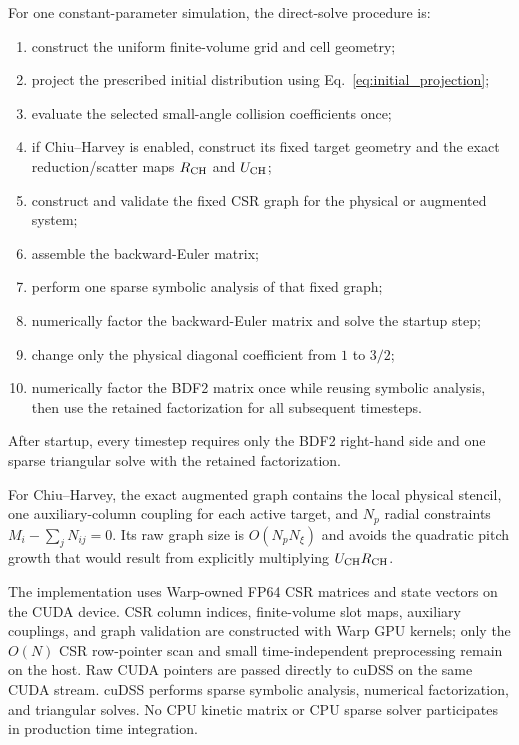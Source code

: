 \documentclass[11pt]{article}
\begin{document}
For one constant-parameter simulation, the direct-solve procedure is:
\begin{enumerate}
 \item construct the uniform finite-volume grid and cell geometry;
 \item project the prescribed initial distribution using Eq.~\eqref{eq:initial_projection};
 \item evaluate the selected small-angle collision coefficients once;
 \item if Chiu--Harvey is enabled, construct its fixed target geometry and the exact
       reduction/scatter maps $R_{\rm CH}$ and $U_{\rm CH}$;
 \item construct and validate the fixed CSR graph for the physical or augmented system;
 \item assemble the backward-Euler matrix;
 \item perform one sparse symbolic analysis of that fixed graph;
 \item numerically factor the backward-Euler matrix and solve the startup step;
 \item change only the physical diagonal coefficient from $1$ to $3/2$;
 \item numerically factor the BDF2 matrix once while reusing symbolic analysis, then use
       the retained factorization for all subsequent timesteps.
\end{enumerate}
After startup, every timestep requires only the BDF2 right-hand side and one sparse
triangular solve with the retained factorization.

For Chiu--Harvey, the exact augmented graph contains the local physical stencil, one
auxiliary-column coupling for each active target, and $N_p$ radial constraints
$M_i-\sum_jN_{ij}=0$.  Its raw graph size is $O(N_pN_\xi)$ and avoids the quadratic
pitch growth that would result from explicitly multiplying $U_{\rm CH}R_{\rm CH}$.

The implementation uses Warp-owned FP64 CSR matrices and state vectors on the CUDA
device.  CSR column indices, finite-volume slot maps, auxiliary couplings, and graph
validation are constructed with Warp GPU kernels; only the $O(N)$ CSR row-pointer scan
and small time-independent preprocessing remain on the host.  Raw CUDA pointers are
passed directly to cuDSS on the same CUDA stream.  cuDSS performs sparse symbolic
analysis, numerical factorization, and triangular solves.  No CPU kinetic matrix or CPU
sparse solver participates in production time integration.
\end{document}
